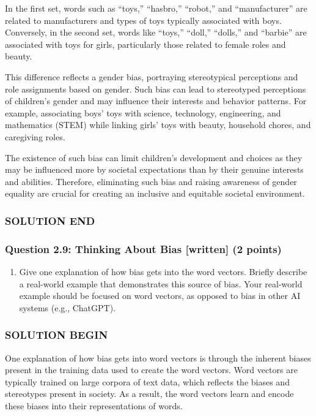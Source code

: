 \documentclass[11pt]{article}
\providecommand{\tightlist}{%
      \setlength{\itemsep}{0pt}\setlength{\parskip}{0pt}}
\begin{document}
In the first set, words such as ``toys,'' ``hasbro,'' ``robot,'' and
``manufacturer'' are related to manufacturers and types of toys
typically associated with boys. Conversely, in the second set, words
like ``toys,'' ``doll,'' ``dolls,'' and ``barbie'' are associated with
toys for girls, particularly those related to female roles and beauty.

This difference reflects a gender bias, portraying stereotypical
perceptions and role assignments based on gender. Such bias can lead to
stereotyped perceptions of children's gender and may influence their
interests and behavior patterns. For example, associating boys' toys
with science, technology, engineering, and mathematics (STEM) while
linking girls' toys with beauty, household chores, and caregiving roles.

The existence of such bias can limit children's development and choices
as they may be influenced more by societal expectations than by their
genuine interests and abilities. Therefore, eliminating such bias and
raising awareness of gender equality are crucial for creating an
inclusive and equitable societal environment.

\subsubsection{SOLUTION END}\label{solution-end}

    \subsubsection{Question 2.9: Thinking About Bias {[}written{]} (2
points)}\label{question-2.9-thinking-about-bias-written-2-points}

\begin{enumerate}
\def\labelenumi{\alph{enumi}.}
\tightlist
\item
  Give one explanation of how bias gets into the word vectors. Briefly
  describe a real-world example that demonstrates this source of bias.
  Your real-world example should be focused on word vectors, as opposed
  to bias in other AI systems (e.g., ChatGPT).
\end{enumerate}

    \subsubsection{SOLUTION BEGIN}\label{solution-begin}

One explanation of how bias gets into word vectors is through the
inherent biases present in the training data used to create the word
vectors. Word vectors are typically trained on large corpora of text
data, which reflects the biases and stereotypes present in society. As a
result, the word vectors learn and encode these biases into their
representations of words.
\end{document}
